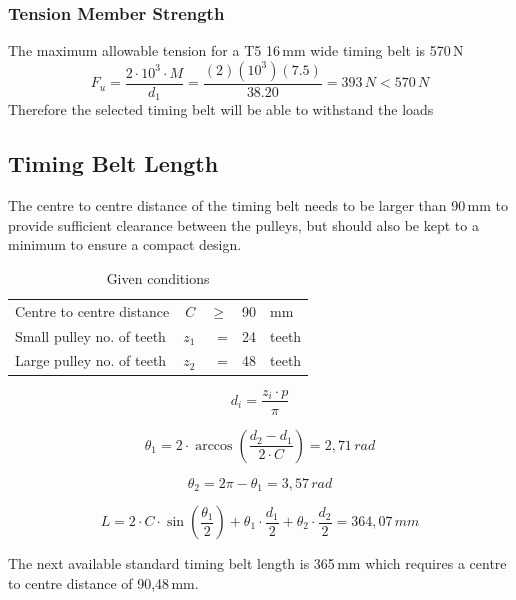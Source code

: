 \documentclass[11pt, titlepage]{article}
\begin{document}
\subsubsection{Tension Member Strength}
The maximum allowable tension for a T5 16\,mm wide timing belt is 570\,N
\begin{equation}
	F_u = \frac{2 \cdot 10^3 \cdot M}{d_1} = \frac{(2)(10^3)(7.5)}{38.20} = 393\, N < 570\,N
\end{equation}
Therefore the selected timing belt will be able to withstand the loads

\subsection{Timing Belt Length}
The centre to centre distance of the timing belt needs to be larger than 90\,mm to provide sufficient clearance between the pulleys, but should also be kept to a minimum to ensure a compact design.

\begin{table}[!h]
\centering
\caption*{Given conditions}
\begin{tabular}{ l r r r l}\hline
	Centre to centre distance & $C$ & $\ge$ & 90 & mm \\
	Small pulley no. of teeth & $z_1$ & = & 24 & teeth \\
	Large pulley no. of teeth & $z_2$ & = & 48 & teeth \\\hline
\end{tabular}
\end{table}

\begin{equation}
	d_i = \frac{z_i\cdot p}{\pi}
\end{equation}

\begin{equation}
	\theta_1 = 2\cdot\arccos(\frac{d_2-d_1}{2\cdot C}) = 2,71\,rad
\end{equation}

\begin{equation}
	\theta_2 = 2\pi -\theta_1 = 3,57\,rad
\end{equation}

\begin{equation}
	L = 2\cdot C\cdot \sin(\frac{\theta_1}{2}) + \theta_1\cdot\frac{d_1}{2} + \theta_2\cdot\frac{d_2}{2} = 364,07\,mm
\end{equation}

The next available standard timing belt length is 365\,mm which requires a centre to centre distance of 90,48\,mm.
\end{document}
